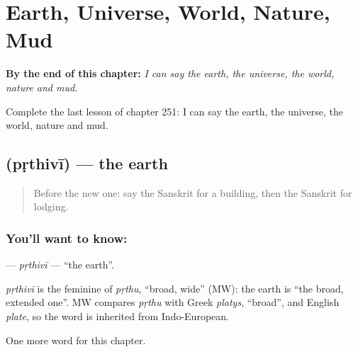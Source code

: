 
\chapter{Earth, Universe, World, Nature, Mud}
\label{ch:sa-earth-universe-world-nature-mud}

\begin{chapteropening}
\textbf{By the end of this chapter:} \emph{I can say the earth, the universe, the world, nature and mud.}

Complete the last lesson of chapter 251: I can say the earth, the universe, the world, nature and mud.
\end{chapteropening}

\section[\texorpdfstring{\sk{पृथिवी} (pṛthivī)}{पृथिवी (pṛthivī)}]{ (pṛthivī) — the earth}

\label{lesson:SA-C251-prthivi}



\begin{quote}
Before the new one: say the Sanskrit for a building, then the Sanskrit for lodging.
\end{quote}

\subsection*{You'll want to know: }
\textbf{} — \emph{pṛthivī} — \textquotedblleft{}the earth\textquotedblright{}.

\begin{cousinweb}
\emph{pṛthivī} is the feminine of \emph{pṛthu}, \textquotedblleft{}broad, wide\textquotedblright{} (MW): the earth is \textquotedblleft{}the broad, extended one\textquotedblright{}. MW compares \emph{pṛthu} with Greek \emph{platys}, \textquotedblleft{}broad\textquotedblright{}, and English \emph{plate}, so the word is inherited from Indo-European.
\end{cousinweb}

\begin{grammarlens}[title={What you've built}]
One more word for this chapter.
\end{grammarlens}

